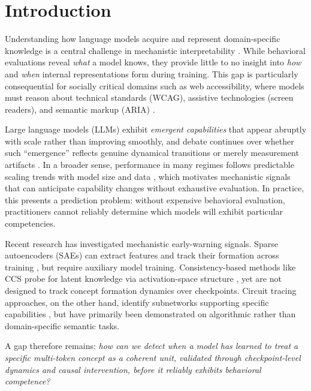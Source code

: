 \documentclass[10pt]{article} %
\begin{document}
\section{Introduction}

Understanding how language models acquire and represent domain-specific knowledge is a central challenge in mechanistic interpretability \citep{olah2020zoom,elhage2021transformer}.
While behavioral evaluations reveal \emph{what} a model knows, they provide little to no insight into \emph{how} and \emph{when} internal representations form during training.
This gap is particularly consequential for socially critical domains such as web accessibility, where models must reason about technical standards (WCAG), assistive technologies (screen readers), and semantic markup (ARIA) \citep{w3c2018wcag}.

Large language models (LLMs) exhibit \emph{emergent capabilities} that appear abruptly with scale rather than improving smoothly, and debate continues over whether such ``emergence'' reflects genuine dynamical transitions or merely measurement artifacts \citep{wei2022emergent,schaeffer2023emergence}.
In a broader sense, performance in many regimes follows predictable scaling trends with model size and data \citep{kaplan2020scaling}, which motivates mechanistic signals that can anticipate capability changes without exhaustive evaluation.
In practice, this presents a prediction problem: without expensive behavioral evaluation, practitioners cannot reliably determine which models will exhibit particular competencies.

Recent research has investigated mechanistic early-warning signals.
Sparse autoencoders (SAEs) can extract features and track their formation across training \citep{bricken2023monosemanticity}, but require auxiliary model training.
Consistency-based methods like CCS probe for latent knowledge via activation-space structure \citep{burns2022discovering}, yet are not designed to track concept formation dynamics over checkpoints.
Circuit tracing approaches, on the other hand, identify subnetworks supporting specific capabilities \citep{olsson2022context}, but have primarily been demonstrated on algorithmic rather than domain-specific semantic tasks.

A gap therefore remains: \emph{how can we detect when a model has learned to treat a specific multi-token concept as a coherent unit, validated through checkpoint-level dynamics and causal intervention, before it reliably exhibits behavioral competence?}
\end{document}
